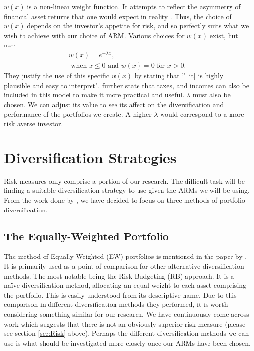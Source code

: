 \documentclass[12pt,a4paper]{article}
\begin{document}
$w(x)$ is a non-linear weight function. It attempts to reflect the asymmetry of financial asset returns that one would expect in reality \citep{CHEN20111777}. Thus, the choice of $w(x)$ depends on the investor's appetite for risk, and so perfectly suits what we wish to achieve with our choice of ARM. Various choices for $w(x)$ exist, but \cite{CHEN20111777} use:
\begin{gather}
w(x)= e^{-\lambda x}, \\
\text{	when	}  x \leq 0
\text{	and	} w(x) = 0 \text{	for	} x > 0. 
\end{gather}
They justify the use of this specific $w(x)$ by stating that '' [it] is highly plausible and easy to interpret". \cite{CHEN20111777} further state that taxes, and incomes can also be included in this model to make it more practical and useful. $\lambda$ must also be chosen. We can adjust its value to see its affect on the diversification and performance of the portfolios we create. A  higher $\lambda$ would correspond to a more risk averse investor\citep{CHEN20111777}.

\section{Diversification Strategies}
\label{sec:Div}

Risk measures only comprise a portion of our research. The difficult task will be finding a suitable diversification strategy to use given the ARMs we will be using. From the work done by \cite{bruder2012managing}, we have decided to focus on three methods of portfolio diversification.

\subsection{The Equally-Weighted Portfolio}
\label{subsec:EW} 

The method of Equally-Weighted (EW) portfolios is mentioned in the paper by \cite{bruder2012managing}. It is primarily used as a point of comparison for other alternative diversification methods. The most notable being the Risk Budgeting (RB) approach. It is a na{\"i}ve diversification method, allocating an equal weight to each asset comprising the portfolio. This is easily understood from its descriptive name. Due to this comparison in different diversification methods they performed, it is worth considering something similar for our research. We have continuously come across work which suggests that there is not an obviously superior risk measure (please see section \ref{sec:Risk} above). Perhaps the different diversification methods we can use is what should be investigated more closely once our ARMs have been chosen.
\end{document}
